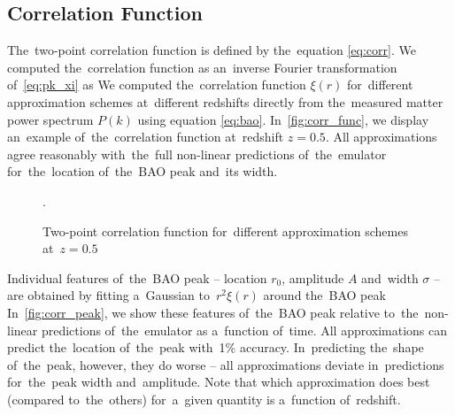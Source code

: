 \subsection{Correlation Function}
\label{sec:corr}
The~two-point correlation function is defined by the~equation \eqref{eq:corr}. We computed the~correlation function as an~inverse Fourier transformation of~\eqref{eq:pk_xi} as
We computed the~correlation function $\xi(r)$ for~different approximation schemes at~different redshifts directly from the~measured matter power spectrum $P(k)$ using equation \eqref{eq:bao}. In~\autoref{fig:corr_func}, we display an~example of~the~correlation function at~redshift $z=0.5$. All approximations agree reasonably with~the~full non-linear predictions of~the~emulator for~the~location of~the~BAO peak and~its width.
\begin{figure}[bt]
\centering
	\begin{subfigure}{0.9\textwidth}
	\end{subfigure}
	\begin{subfigure}{0.9\textwidth}
		\centering
	\end{subfigure}
	\caption{Two-point correlation function for~different approximation schemes at~$z=0.5$}.
	\label{fig:corr_func}
\end{figure}

Individual features of~the~BAO peak -- location $r_0$, amplitude $A$ and~width $\sigma$ -- are obtained by fitting a~Gaussian to~$r^2\xi(r)$ around the~BAO peak
In~\autoref{fig:corr_peak}, we show these features of~the~BAO peak relative to~the~non-linear predictions of~the~emulator as a~function of~time. All approximations can predict the~location of~the~peak with~1\% accuracy. In~predicting the~shape of~the~peak, however, they do worse -- all approximations deviate in~predictions for~the~peak width and~amplitude. Note that which approximation does best (compared to~the~others) for~a~given quantity is a~function of~redshift.



